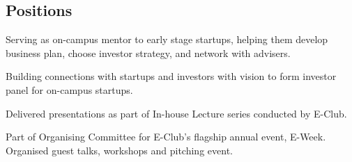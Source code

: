 \documentclass[]{deedy}
\begin{document}
\begin{minipage}[t]{0.69\textwidth}
\begin{flushleft}
\section{Positions}
%
\vspace{1.1pt}
\begin{tightemize}
\item Serving as on-campus mentor to early stage startups, helping them develop business plan, choose investor strategy, and network with advisers.
\item Building connections with startups and investors with vision to form investor panel for on-campus startups.
\item Delivered presentations as part of In-house Lecture series conducted by E-Club.
\end{tightemize}
\sectionsep
%
\vspace{1.1pt}
\begin{tightemize}
\item Part of Organising Committee for E-Club’s flagship annual event, E-Week. Organised guest talks, workshops and pitching event.
\end{tightemize}
\sectionsep
%
\vspace{1.1pt}
\sectionsep
%
\end{flushleft}
\end{minipage}
\end{document}
